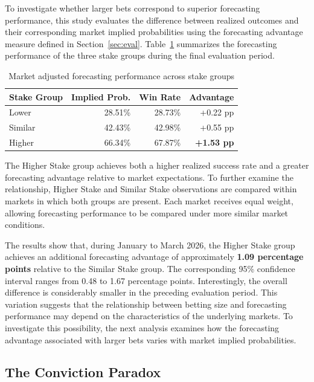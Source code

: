 To investigate whether larger bets correspond to superior forecasting performance, this study evaluates the difference between realized outcomes and their corresponding market implied probabilities using the forecasting advantage measure defined in Section~\ref{sec:eval}. Table~\ref{tab:stake} summarizes the forecasting performance of the three stake groups during the final evaluation period.

\begin{table}[htbp]
\centering
\caption{Market adjusted forecasting performance across stake groups}\label{tab:stake}
\begin{tabular}{lrrr}
\toprule
Stake Group & Implied Prob. & Win Rate & Advantage \\
\midrule
Lower & 28.51\% & 28.73\% & +0.22 pp \\
Similar & 42.43\% & 42.98\% & +0.55 pp \\
Higher & 66.34\% & 67.87\% & \textbf{+1.53 pp} \\
\bottomrule
\end{tabular}
\end{table}

The Higher Stake group achieves both a higher realized success rate and a greater forecasting advantage relative to market expectations. To further examine the relationship, Higher Stake and Similar Stake observations are compared within markets in which both groups are present. Each market receives equal weight, allowing forecasting performance to be compared under more similar market conditions.

The results show that, during January to March 2026, the Higher Stake group achieves an additional forecasting advantage of approximately \textbf{1.09 percentage points} relative to the Similar Stake group. The corresponding 95\% confidence interval ranges from 0.48 to 1.67 percentage points. Interestingly, the overall difference is considerably smaller in the preceding evaluation period. This variation suggests that the relationship between betting size and forecasting performance may depend on the characteristics of the underlying markets. To investigate this possibility, the next analysis examines how the forecasting advantage associated with larger bets varies with market implied probabilities.

\subsection{The Conviction Paradox}

